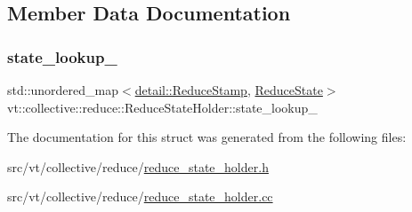 \subsection{Member Data Documentation}
\mbox{\label{structvt_1_1collective_1_1reduce_1_1_reduce_state_holder_ab30bde72498ebf851969c1914c3378c6}} 
\subsubsection{\texorpdfstring{state\+\_\+lookup\+\_\+}{state\_lookup\_}}
{\footnotesize\ttfamily std\+::unordered\+\_\+map$<$\hyperlink{namespacevt_1_1collective_1_1reduce_1_1detail_aacc1fcd729d934ba143fee3a943bf9e7}{detail\+::\+Reduce\+Stamp}, \hyperlink{structvt_1_1collective_1_1reduce_1_1_reduce_state}{Reduce\+State}$>$ vt\+::collective\+::reduce\+::\+Reduce\+State\+Holder\+::state\+\_\+lookup\+\_\+\hspace{0.3cm}{\ttfamily [private]}}



The documentation for this struct was generated from the following files\+:\begin{DoxyCompactItemize}
\item 
src/vt/collective/reduce/\hyperlink{reduce__state__holder_8h}{reduce\+\_\+state\+\_\+holder.\+h}\item 
src/vt/collective/reduce/\hyperlink{reduce__state__holder_8cc}{reduce\+\_\+state\+\_\+holder.\+cc}\end{DoxyCompactItemize}

